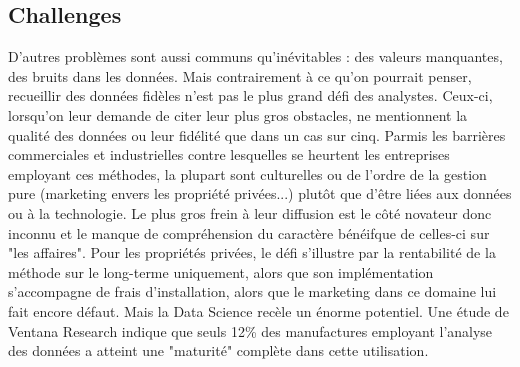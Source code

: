 \documentclass[a4paper]{article}
\begin{document}
\begin{multicols}{2}
\subsection{Challenges}
D’autres problèmes sont aussi communs qu’inévitables : des valeurs manquantes, des bruits dans les données. Mais contrairement à ce qu’on pourrait penser, recueillir des données fidèles n’est pas le plus grand défi des analystes. Ceux-ci, lorsqu’on leur demande de citer leur plus gros obstacles, ne mentionnent la qualité des données ou leur fidélité que dans un cas sur cinq. Parmis les barrières commerciales et industrielles contre lesquelles se heurtent les entreprises employant ces méthodes, la plupart sont culturelles ou de l’ordre de la gestion pure (marketing envers les propriété privées...) plutôt que d’être liées aux données ou à la technologie. Le plus gros frein à leur diffusion est le côté novateur donc inconnu et le manque de compréhension du caractère bénéifque de celles-ci sur "les affaires". Pour les propriétés privées, le défi s’illustre par la rentabilité de la méthode sur le long-terme uniquement, alors que son implémentation s’accompagne de frais d’installation, alors que le marketing dans ce domaine lui fait encore défaut. Mais la Data Science recèle un énorme potentiel. Une étude de Ventana Research indique que seuls 12\% des manufactures employant l’analyse des données a atteint une "maturité" complète dans cette utilisation.
\end{multicols}
\end{document}
